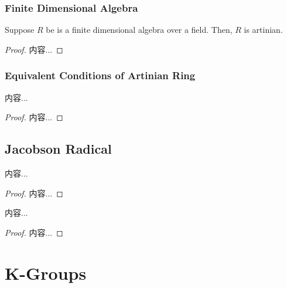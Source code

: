 \documentclass[Total.tex]{subfiles}
\begin{document}
			\subsubsection{Finite Dimensional Algebra}
			\begin{lemma}
				Suppose $R$ be is a finite dimensional algebra over a field. Then, $R$ is artinian. 
			\end{lemma}
			
			\begin{proof}
				内容...
			\end{proof}
			\subsubsection{Equivalent Conditions of Artinian Ring}
			\begin{lemma}
				内容...
			\end{lemma}
			\begin{proof}
				内容...
			\end{proof}
			
			\subsection{Jacobson Radical}
			\begin{lemma}
				内容...
			\end{lemma}
			\begin{proof}
				内容...
			\end{proof}
			
			\begin{lemma}
				内容...
			\end{lemma}
			\begin{proof}
				内容...
			\end{proof}
		\section{K-Groups}
		
\end{document}
